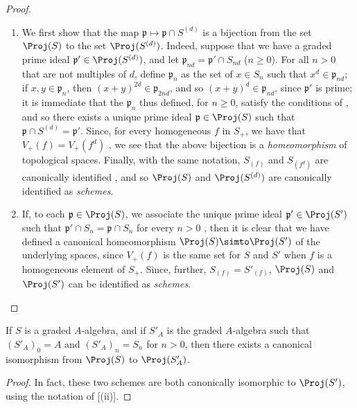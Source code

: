 \begin{proof}
\medskip\noindent
\begin{enumerate}
  \item[{\rm(i)}] We first show that the map $\mathfrak{p}\mapsto\mathfrak{p}\cap S^{(d)}$ is a bijection from the set $\Proj(S)$ to the set $\Proj(S^{(d)})$.
    Indeed, suppose that we have a graded prime ideal $\mathfrak{p}'\in\Proj(S^{(d)})$, and let $\mathfrak{p}_{nd}=\mathfrak{p}'\cap S_{nd}$ ($n\geq0$).
    For all $n>0$ that are not multiples of $d$, define $\mathfrak{p}_n$ as the set of $x\in S_n$ such that $x^d\in\mathfrak{p}_{nd}$;
    if $x,y\in\mathfrak{p}_n$, then $(x+y)^{2d}\in\mathfrak{p}_{2nd}$, and so $(x+y)^d\in\mathfrak{p}_{nd}$, since $\mathfrak{p}'$ is prime;
    it is immediate that the $\mathfrak{p}_n$ thus defined, for $n\geq0$, satisfy the conditions of , and so there exists a unique prime ideal $\mathfrak{p}\in\Proj(S)$ such that $\mathfrak{p}\cap S^{(d)}=\mathfrak{p}'$.
    Since, for every homogeneous $f$ in $S_+$, we have that $V_+(f)=V_+(f^d)$ , we see that the above bijection is a \emph{homeomorphism} of topological spaces.
    Finally, with the same notation, $S_{(f)}$ and $S_{(f^d)}$ are canonically identified , and so $\Proj(S)$ and $\Proj(S^{(d)})$ are canonically identified as \emph{schemes}.
  \item[{\rm(ii)}] If, to each $\mathfrak{p}\in\Proj(S)$, we associate the unique prime ideal $\mathfrak{p}'\in\Proj(S')$ such that $\mathfrak{p}'\cap S_n=\mathfrak{p}\cap S_n$ for every $n>0$ , then it is clear that we have defined a canonical homeomorphism $\Proj(S)\simto\Proj(S')$ of the underlying spaces, since $V_+(f)$ is the same set for $S$ and $S'$ when $f$ is a homogeneous element of $S_+$.
  Since, further, $S_{(f)}=S'_{(f)}$, $\Proj(S)$ and $\Proj(S')$ can be identified as \emph{schemes}.
\end{enumerate}
\end{proof}

\begin{corollary}[2.4.8]
\label{II.2.4.8}
If $S$ is a graded $A$-algebra, and if $S'_A$ is the graded $A$-algebra such that $(S'_A)_0=A$ and $(S'_A)_n=S_n$ for $n>0$, then there exists a canonical isomorphism from $\Proj(S)$ to $\Proj(S'_A)$.
\end{corollary}

\begin{proof}
In fact, these two schemes are both canonically isomorphic to $\Proj(S')$, using the notation of [(ii)].
\end{proof}


